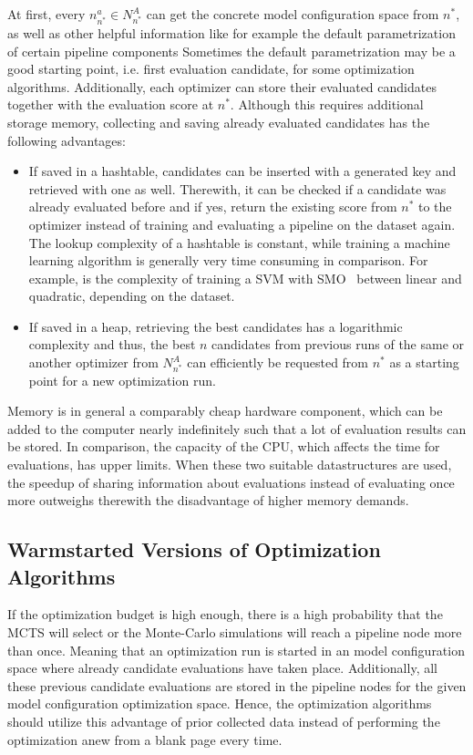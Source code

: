 At first, every $n^{a}_{n^*} \in N^A_{n^*}$ can get the concrete model configuration space from $n^*$, as well as other helpful information like for example the default parametrization of certain pipeline components
Sometimes the default parametrization may be a good starting point, i.e. first evaluation candidate, for some optimization algorithms.\newline
Additionally, each optimizer can store their evaluated candidates together with the evaluation score at $n^*$.
Although this requires additional storage memory, collecting and saving already evaluated candidates has the following advantages:
\begin{itemize}
    \item If saved in a hashtable, candidates can be inserted with a generated key and retrieved with one as well. Therewith, it can be checked if a candidate was already evaluated before and if yes, return the existing score from $n^*$ to the optimizer instead of training and evaluating a pipeline on the dataset again.
    The lookup complexity of a hashtable is constant, while training a machine learning algorithm is generally very time consuming in comparison.
    For example, is the complexity of training a SVM with SMO~\cite{Platt-SMO} between linear and quadratic, depending on the dataset.
    \item If saved in a heap, retrieving the best candidates has a logarithmic complexity and thus, the best $n$ candidates from previous runs of the same or another optimizer from $N^A_{n^*}$ can efficiently be requested from $n^*$ as a starting point for a new optimization run.
\end{itemize}
Memory is in general a comparably cheap hardware component, which can be added to the computer nearly indefinitely such that a lot of evaluation results can be stored.
In comparison, the capacity of the CPU, which affects the time for evaluations, has upper limits.
When these two suitable datastructures are used, the speedup of sharing information about evaluations instead of evaluating once more outweighs therewith the disadvantage of higher memory demands.

\subsection{Warmstarted Versions of Optimization Algorithms}
\label{sec:approach:configuration:warmstart}
If the optimization budget is high enough, there is a high probability that the MCTS will select or the Monte-Carlo simulations will reach a pipeline node more than once.
Meaning that an optimization run is started in an model configuration space where already candidate evaluations have taken place.
Additionally, all these previous candidate evaluations are stored in the pipeline nodes for the given model configuration optimization space.
Hence, the optimization algorithms should utilize this advantage of prior collected data instead of performing the optimization anew from a blank page every time.

